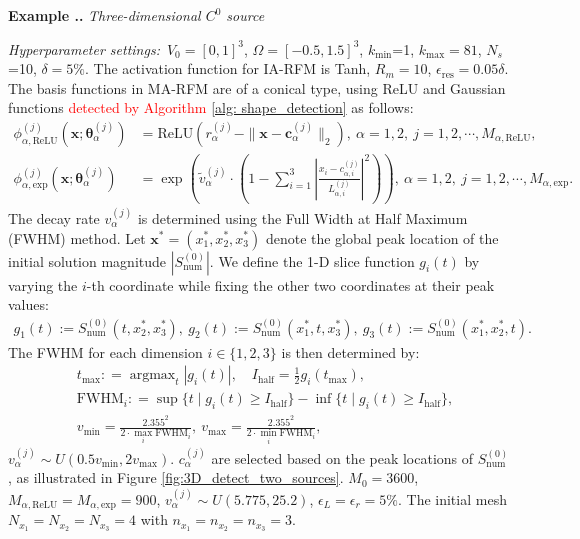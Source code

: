 \documentclass{article}
\newcommand{\red}[1]{\textcolor{red}{#1}}
\theoremstyle{plain}
\theoremstyle{definition}
\newcounter{example}[section]         %
\renewcommand{\theexample}{\thesection.\arabic{example}}
\newenvironment{example}[1][]{
    \refstepcounter{example}%
    \par\noindent\textbf{Example \theexample.} #1 \par
}{\par}
\begin{document}
{\begin{example}[\emph{Three-dimensional $C^0$ source}]
\noindent \emph{Hyperparameter settings:}\ $V_0=[0, 1]^3$, $\Omega=[-0.5, 1.5]^3$,   $k_{\text{min}}$=1,  $k_{\text{max}}=81$,   $N_s$=10,  $\delta=5\%$. The activation function for IA-RFM is Tanh, $R_m=10$,  $\epsilon_{\text{res}}=0.05\delta$. The basis functions in MA-RFM are of a conical type,  using ReLU and Gaussian functions \red{detected by Algorithm \ref{alg: shape_detection}} as follows: 
    \begin{align*}
    \phi_{\alpha,\text{ReLU}}^{(j)}(\boldsymbol{x};\boldsymbol{\theta}_\alpha^{(j)})&=\text{ReLU}\left(r_\alpha^{(j)}-\|\boldsymbol{x}-\boldsymbol{c}_{\alpha}^{(j)}\|_2\right)
    ,\ \alpha=1,2,\ j=1, 2, \cdots, M_{\alpha,\text{ReLU}}, \\
    \phi_{\alpha,\text{exp}}^{(j)}(\boldsymbol{x};\boldsymbol{\theta}_\alpha^{(j)})&= \exp\left(\tilde{v}_\alpha^{(j)} \cdot \left(1- \sum_{i=1}^3\left|\frac{x_i - c_{\alpha,i}^{(j)}}{L_{\alpha,i}^{(j)}}\right|^2\right)\right), \ \alpha=1,2,\  j=1, 2, \cdots, M_{\alpha,\text{exp}}.
    \end{align*}
 {The decay rate $v^{(j)}_\alpha$ is determined using the Full Width at Half Maximum (FWHM) method. Let $\boldsymbol{x}^* = (x_1^*, x_2^*, x_3^*)$ denote the global peak location of the initial solution magnitude $|S_{\text{num}}^{(0)}|$.  We define the 1-D slice function $g_i(t)$ by varying the $i$-th coordinate while fixing the other two coordinates at their peak values:
\begin{align*}
g_1(t):= S_{\text{num}}^{(0)}(t, x_2^*, x_3^*), \
g_2(t):= S_{\text{num}}^{(0)}(x_1^*, t, x_3^*), \
g_3(t):= S_{\text{num}}^{(0)}(x_1^*, x_2^*, t).
\end{align*}
The FWHM for each dimension $i \in \{1,2,3\}$ is then determined by:
\begin{align*}
    &t_{\text{max}} : = \mathop{\arg\max}_{t} |g_i(t)|,  \quad I_{\text{half}}=\frac{1}{2}g_i(t_{\text{max}}),\\&\text{FWHM}_i : = \sup\{t \mid g_i(t) \ge I_\text{{half}}\} - \inf\{t \mid g_i(t) \ge I_{\text{half}}\},\\
    &v_{\text{min}}=\frac{2.355^2}{2\cdot \max\limits_{i} \text{FWHM}_i}, \ v_{\text{max}}=\frac{2.355^2}{2\cdot \min\limits_{i} \text{FWHM}_i},
\end{align*}
}
$v^{(j)}_\alpha\sim U(0.5 v_{\text{min}}, 2 v_{\text{max}})$. $c^{(j)}_\alpha$ are selected based on the peak locations of $S_{\text{num}}^{(0)}$,  as illustrated in Figure \ref{fig:3D_detect_two_sources}. $M_0=3600$, $M_{\alpha,\text{ReLU}}=M_{\alpha,\text{exp}}=900$, $v^{(j)}_\alpha\sim U(5.775,25.2)$, $\epsilon_{L}= \epsilon_r=5\%$.  The initial mesh $N_{x_1}=N_{x_2}=N_{x_3}=4$ with $n_{x_1}=n_{x_2}=n_{x_3}=3$.


\end{example}}
\end{document}
